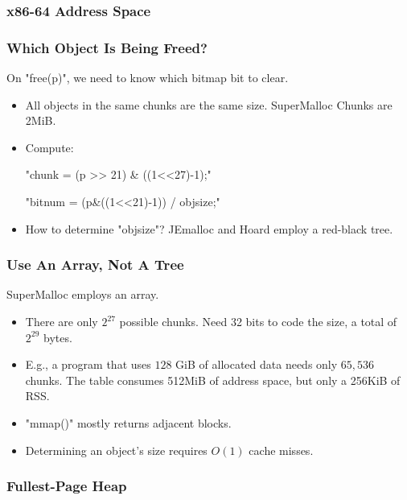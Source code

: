 \documentclass[xcolor=dvipsnames,14pt]{beamer}
\begin{document}
\begin{frame}[fragile]
\frametitle{x86-64 Address Space}


\end{frame}

\begin{frame}[fragile]
\frametitle{Which Object Is Being Freed?}

On "free(p)", we need to know which bitmap bit to clear.
\begin{itemize}
\item All objects in the same chunks are the same size.  SuperMalloc Chunks are 2MiB.

\item Compute:

  "chunk  = (p >> 21) & ((1<<27)-1);"

  "bitnum = (p&((1<<21)-1)) / objsize;"

\item How to determine "objsize"?
JEmalloc and Hoard employ a red-black tree.
\end{itemize}
\end{frame}

\begin{frame}[fragile]
\frametitle{Use An Array, Not A Tree}

SuperMalloc employs an array.
\begin{itemize}
\item There are only $2^{27}$ possible chunks.  Need 32 bits to code the size, a total of
$2^{29}$ bytes.

\item E.g., a program that uses $128$ GiB of allocated data needs only
  $65,536$ chunks.  The table consumes 512MiB of address space, but
  only a 256KiB of RSS.

\item "mmap()" mostly returns adjacent blocks.

\item Determining an object's size requires $O(1)$ cache misses.
\end{itemize}
\end{frame}

\begin{frame}
\frametitle{Fullest-Page Heap}

\end{frame}


\end{document}
